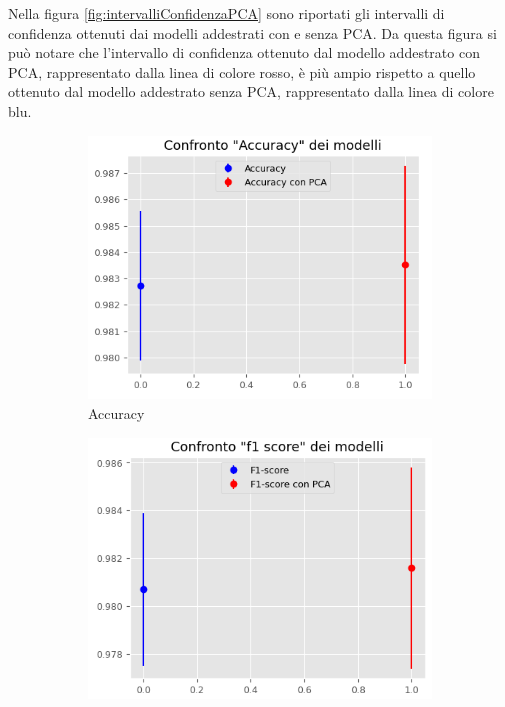 Nella figura \ref{fig:intervalliConfidenzaPCA} sono riportati gli intervalli di
confidenza ottenuti dai modelli addestrati con e senza PCA. Da questa figura si
può notare che l'intervallo di confidenza ottenuto dal modello addestrato con
PCA, rappresentato dalla linea di colore rosso, è più ampio rispetto a quello
ottenuto dal modello addestrato senza PCA, rappresentato dalla linea di colore blu.
\begin{figure}[!ht]
    \centering
    \begin{subfigure}[b]{0.4\textwidth}
        \centering
        \includegraphics[width=\textwidth]{img/rete/intervalliAcc.png}
        \caption{Accuracy}
        \label{fig:acc}
    \end{subfigure}
    \hfill
    \begin{subfigure}[b]{0.4\textwidth}
        \centering
        \includegraphics[width=\textwidth]{img/rete/intervalliF1.png}

\end{subfigure}
\end{figure}
